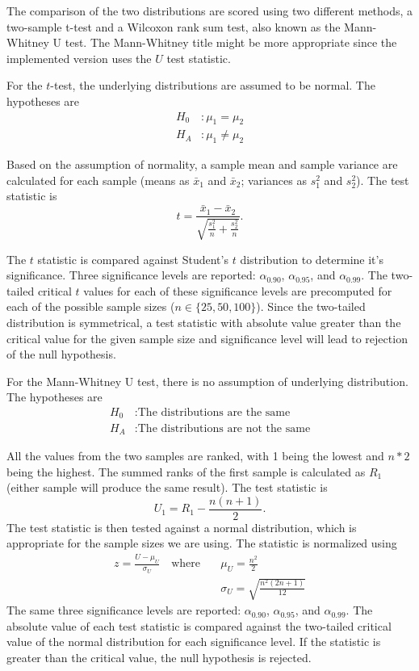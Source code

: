 \documentclass{article}
\begin{document}
The comparison of the two distributions are scored using two different methods, a two-sample t-test and a Wilcoxon rank sum test, also known as the Mann-Whitney U test. The Mann-Whitney title might be more appropriate since the implemented version uses the $U$ test statistic.

For the $t$-test, the underlying distributions are assumed to be normal. The hypotheses are 
\begin{align*}
H_0&: \mu_1 = \mu_2\\
H_A&: \mu_1 \neq \mu_2
\end{align*}

Based on the assumption of normality, a sample mean and sample variance are calculated for each sample (means as $\bar{x}_1$ and $\bar{x}_2$; variances as $s^2_1$ and $s^2_2$). The test statistic is $$t = \frac{\bar{x}_1-\bar{x}_2}{\sqrt{\frac{s^2_1}{n}+\frac{s^2_2}{n}}}.$$

The $t$ statistic is compared against Student's $t$ distribution to determine it's significance. Three significance levels are reported: $\alpha_{0.90}$, $\alpha_{0.95}$, and $\alpha_{0.99}$. The two-tailed critical $t$ values for each of these significance levels are precomputed for each of the possible sample sizes ($n \in \{25, 50, 100\}$). Since the two-tailed distribution is symmetrical, a test statistic with absolute value greater than the critical value for the given sample size and significance level will lead to rejection of the null hypothesis. 

For the Mann-Whitney U test, there is no assumption of underlying distribution. The hypotheses are 
\begin{align*}
H_0&: \text{The distributions are the same}\\
H_A&: \text{The distributions are not the same}
\end{align*}

All the values from the two samples are ranked, with 1 being the lowest and $n*2$ being the highest. The summed ranks of the first sample is calculated as $R_1$(either sample will produce the same result). The test statistic is $$U_1 = R_1 - \frac{n(n+1)}{2}.$$ The test statistic is then tested against a normal distribution, which is appropriate for the sample sizes we are using. The statistic is normalized using 
\begin{align*}
z = \frac{U - \mu_U}{\sigma_U} \quad\text{where}\quad&\mu_U = \frac{n^2}{2}\\&\sigma_U = \sqrt{\frac{n^2(2n+1)}{12}}
\end{align*}
The same three significance levels are reported: $\alpha_{0.90}$, $\alpha_{0.95}$, and $\alpha_{0.99}$. The absolute value of each test statistic is compared against the two-tailed critical value of the normal distribution for each significance level. If the statistic is greater than the critical value, the null hypothesis is rejected.
\end{document}
